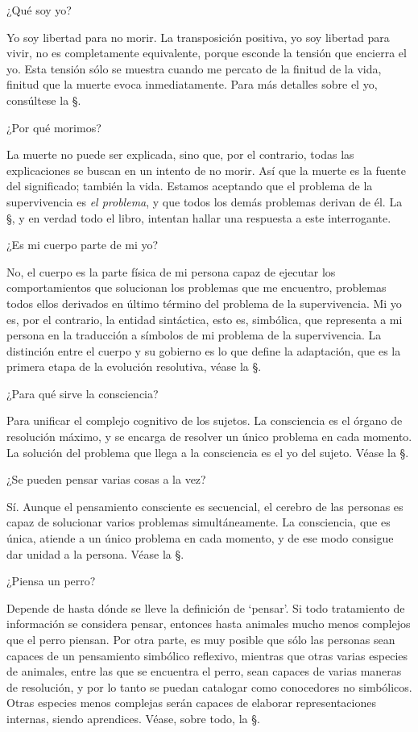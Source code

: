 \Q ¿Qué soy yo?

Yo soy libertad para no morir.  La transposición positiva, yo soy libertad
para vivir, no es completamente equivalente, porque esconde la tensión que
encierra el yo.  Esta tensión sólo se muestra cuando me percato de la
finitud de la vida, finitud que la muerte evoca inmediatamente.  Para más
detalles sobre el yo, consúltese la \S{}.

\Q ¿Por qué morimos?

La muerte no puede ser explicada, sino que, por el contrario, todas las
explicaciones se buscan en un intento de no morir.  Así que la muerte es la
fuente del significado; también la vida.  Estamos aceptando que el problema
de la supervivencia es {\it el problema}, y que todos los demás problemas
derivan de él.  La \S{}, y en verdad todo el libro,
intentan hallar una respuesta a este interrogante.

\Q ¿Es mi cuerpo parte de mi yo?

No, el cuerpo es la parte física de mi persona capaz de ejecutar los
comportamientos que solucionan los problemas que me encuentro, problemas
todos ellos derivados en último término del problema de la supervivencia.
Mi yo es, por el contrario, la entidad sintáctica, esto es, simbólica, que
representa a mi persona en la traducción a símbolos de mi problema de la
supervivencia.  La distinción entre el cuerpo y su gobierno es lo que define
la adaptación, que es la primera etapa de la evolución resolutiva, véase la
\S{}.

\Q ¿Para qué sirve la consciencia?

Para unificar el complejo cognitivo de los sujetos.  La consciencia es el
órgano de resolución máximo, y se encarga de resolver un único problema en
cada momento.  La solución del problema que llega a la consciencia es el yo
del sujeto.  Véase la \S{}.

\Q ¿Se pueden pensar varias cosas a la vez?

Sí.  Aunque el pensamiento consciente es secuencial, el cerebro de las
personas es capaz de solucionar varios problemas simultáneamente.  La
consciencia, que es única, atiende a un único problema en cada momento, y de
ese modo consigue dar unidad a la persona.  Véase la \S{}.

\Q ¿Piensa un perro?

Depende de hasta dónde se lleve la definición de `pensar'.  Si todo
tratamiento de información se considera pensar, entonces hasta animales
mucho menos complejos que el perro piensan.  Por otra parte, es muy posible
que sólo las personas sean capaces de un pensamiento simbólico reflexivo,
mientras que otras varias especies de animales, entre las que se encuentra
el perro, sean capaces de varias maneras de resolución, y por lo tanto se
puedan catalogar como conocedores no simbólicos.  Otras especies menos
complejas serán capaces de elaborar representaciones internas, siendo
aprendices.  Véase, sobre todo, la \S{}.

